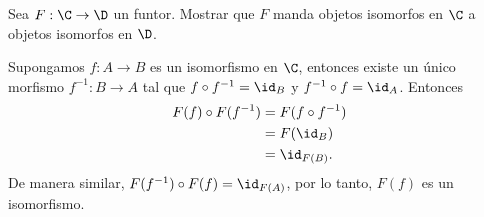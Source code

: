 \begin{ejercicio}
    Sea $F:\C\to\D$ un funtor. Mostrar que $F$ manda objetos isomorfos en $\C$ a objetos isomorfos en $\D$.
\end{ejercicio}

\begin{demostracion}
Supongamos $f:A\to B$ es un isomorfismo en $\C$, entonces existe un único morfismo $f^{-1}:B\to A$ tal que $f\circ f^{-1}=\id_B$ y $f^{-1}\circ f=\id_A$. Entonces
\begin{align*}
    F(f)\circ F(f^{-1})&=F(f\circ f^{-1})\\
    &=F(\id_B)\\
    &=\id_{F(B)}.
\end{align*}
De manera similar, $F(f^{-1})\circ F(f)=\id_{F(A)}$, por lo tanto, $F(f)$ es un isomorfismo.
\end{demostracion}
